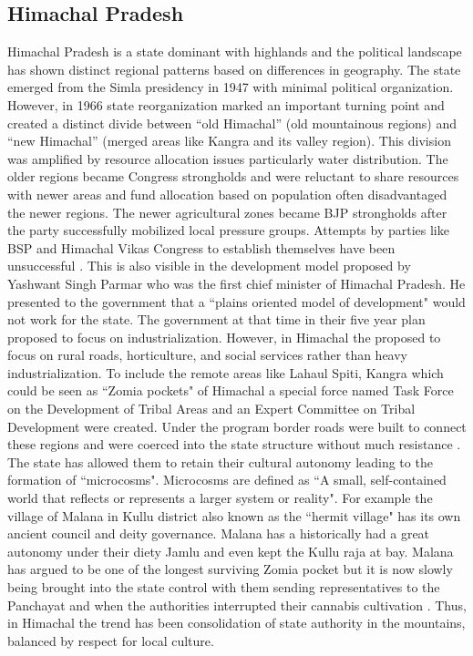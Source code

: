 \subsection{Himachal Pradesh}

 Himachal Pradesh is a state dominant with highlands and the political landscape has shown distinct regional patterns based on differences in geography. The state emerged from the Simla presidency in 1947 with minimal political organization. However, in 1966 state reorganization marked an important turning point and created a distinct divide between \enquote{old Himachal} (old mountainous regions) and \enquote{new Himachal} (merged areas like Kangra and its valley region)\citep{TR_Sharma_1987}. This division was amplified by resource allocation issues particularly water distribution. The older regions became Congress strongholds and were reluctant to share resources with newer areas and fund allocation based on population often disadvantaged the newer regions. The newer agricultural zones became BJP strongholds after the party successfully mobilized local pressure groups. Attempts by parties like BSP and Himachal Vikas Congress to establish themselves have been unsuccessful \citep{chauhan2004bipolar}. This is also visible in the development model proposed by Yashwant Singh Parmar who was the first chief minister of Himachal Pradesh. He presented to the  government that a ``plains oriented model of development" would not work for the state. The  government at that time in their five year plan proposed to  focus on industrialization. However, in Himachal the proposed to focus on rural roads, horticulture, and social services rather than heavy industrialization. To include the remote areas like Lahaul Spiti, Kangra which could be seen as ``Zomia pockets" of Himachal a special force named Task Force on the Development of Tribal Areas and an Expert Committee on Tribal Development were created. Under the program border roads were built to connect these regions and were coerced into the state structure without much resistance \citep{StateEffectiveness2020}. The state has allowed them to retain their cultural autonomy leading to the formation of ``microcosms". Microcosms are defined as ``A small, self-contained world that reflects or represents a larger system or reality". For example the village of Malana in Kullu district also known as the ``hermit village" has its own ancient council and deity governance. Malana has a historically had a great autonomy under their diety Jamlu and even kept the Kullu raja at bay. Malana has argued to be one of the longest surviving Zomia pocket but it is now slowly being brought into the state control with them sending representatives to the Panchayat and when the authorities interrupted their cannabis cultivation \citep{axelby2015hermit}. Thus, in Himachal the trend has been consolidation of state authority in the mountains, balanced by respect for local culture.

